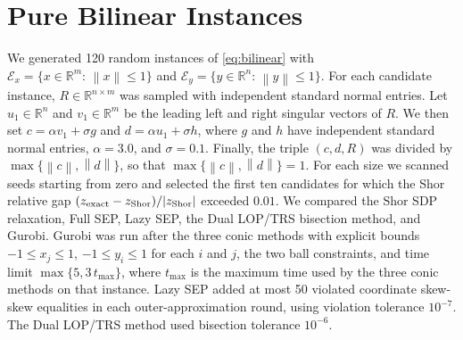 \documentclass[11pt]{article}
\providecommand{\Rbb}{\mathbb{R}}
\providecommand{\Ecal}{\mathcal{E}}
\providecommand{\suchthat}{:\,}
\providecommand{\norm}[1]{\left\lVert #1\right\rVert}
\begin{document}
\section{Pure Bilinear Instances}
\noindent We generated 120 random instances of \eqref{eq:bilinear} with
\(\Ecal_x=\{x\in\Rbb^m\suchthat \norm{x}\le 1\}\) and
\(\Ecal_y=\{y\in\Rbb^n\suchthat \norm{y}\le 1\}\).  For each candidate instance, \(R\in\Rbb^{n\times m}\) was sampled with independent standard normal entries.  Let \(u_1\in\Rbb^n\) and \(v_1\in\Rbb^m\) be the leading left and right singular vectors of \(R\).  We then set \(c=\alpha v_1+\sigma g\) and \(d=\alpha u_1+\sigma h\), where \(g\) and \(h\) have independent standard normal entries, \(\alpha=3.0\), and \(\sigma=0.1\).  Finally, the triple \((c,d,R)\) was divided by \(\max\{\norm{c},\norm{d}\}\), so that \(\max\{\norm{c},\norm{d}\}=1\).
For each size we scanned seeds starting from zero and selected the first ten candidates for which the Shor relative gap \((z_{\rm exact}-z_{\rm Shor})/|z_{\rm Shor}|\) exceeded \(0.01\).  We compared the Shor SDP relaxation, Full SEP, Lazy SEP,
the Dual LOP/TRS bisection method, and Gurobi.
Gurobi was run after the three conic methods with explicit bounds
\(-1\le x_j\le 1\), \(-1\le y_i\le 1\) for each \(i\) and \(j\), the two
ball constraints, and time limit \(\max\{5,3\,t_{\max}\}\), where
\(t_{\max}\) is the maximum time used by the three conic methods on that
instance.  Lazy SEP added at most 50 violated coordinate skew-skew equalities
in each outer-approximation round, using violation tolerance \(10^{-7}\).
The Dual LOP/TRS method used bisection tolerance \(10^{-6}\).
\end{document}
